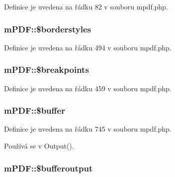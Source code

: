 Definice je uvedena na řádku 82 v souboru mpdf.\-php.

\hypertarget{classm_p_d_f_a5c70b71dc75970c8481141a9d3f25048}{
\subsubsection[{\$borderstyles}]{\setlength{\rightskip}{0pt plus 5cm}m\-P\-D\-F\-::\$borderstyles}}\label{classm_p_d_f_a5c70b71dc75970c8481141a9d3f25048}


Definice je uvedena na řádku 494 v souboru mpdf.\-php.

\hypertarget{classm_p_d_f_a73e3a12d0f5e0615e48adfc05e7f3c7d}{
\subsubsection[{\$breakpoints}]{\setlength{\rightskip}{0pt plus 5cm}m\-P\-D\-F\-::\$breakpoints}}\label{classm_p_d_f_a73e3a12d0f5e0615e48adfc05e7f3c7d}


Definice je uvedena na řádku 459 v souboru mpdf.\-php.

\hypertarget{classm_p_d_f_a2024c7a11408480ff7797e1bfa56ff53}{
\subsubsection[{\$buffer}]{\setlength{\rightskip}{0pt plus 5cm}m\-P\-D\-F\-::\$buffer}}\label{classm_p_d_f_a2024c7a11408480ff7797e1bfa56ff53}


Definice je uvedena na řádku 745 v souboru mpdf.\-php.



Používá se v Output().

\hypertarget{classm_p_d_f_aabe5f99c2838902a98789c8d9b9fb8f1}{
\subsubsection[{\$bufferoutput}]{\setlength{\rightskip}{0pt plus 5cm}m\-P\-D\-F\-::\$bufferoutput}}\label{classm_p_d_f_aabe5f99c2838902a98789c8d9b9fb8f1}


